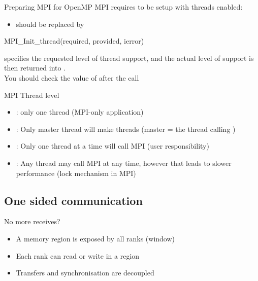 \documentclass[aspectratio=43]{beamer}
\begin{document}
\begin{frame}[fragile]{Preparing MPI for OpenMP}
MPI requires to be setup with threads enabled:
\begin{itemize}
\item {} should be replaced by 
\end{itemize}
\begin{Pseudolisting}[]{}
MPI_Init_thread(required, provided, ierror)
\end{Pseudolisting}

 specifies the requested level of thread support, and the actual level of support is then returned into .\\
You should check the value of  after the call
\end{frame}

\begin{frame}[fragile]{MPI Thread level}
\begin{itemize}
    \item {}: only one thread (MPI-only application)
    \item {}: Only master thread will make threads (master = the thread calling )
    \item {}: Only one thread at a time will call MPI (user responsibility)
    \item {}: Any thread may call MPI at any time, however that leads to slower performance (lock mechanism in MPI)
\end{itemize}
\end{frame}



\subsection{One sided communication}

\begin{frame}[fragile]{No more receives?}
\begin{itemize}
    \item A memory region is exposed by all ranks (window)
    \item Each rank can read or write in a region
    \item Transfers and synchronisation are decoupled
\end{itemize}
\end{frame}
\end{document}
